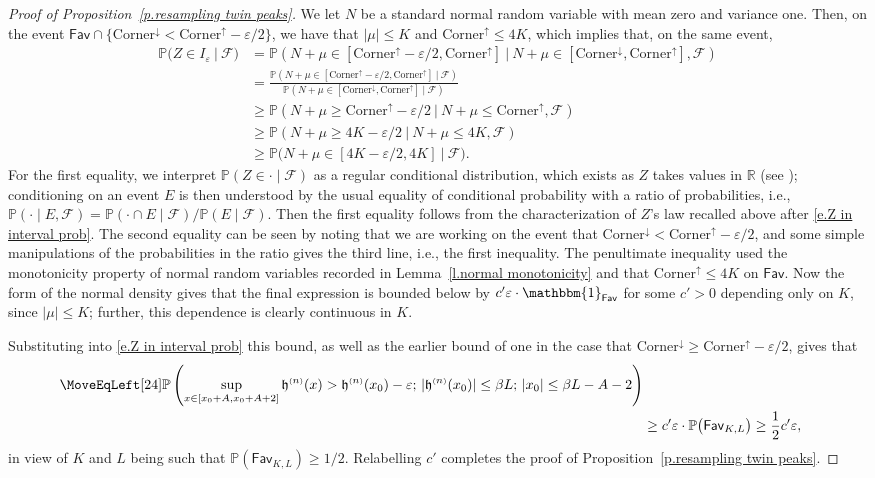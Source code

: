 \documentclass[oneside,final,11pt]{amsart}
\theoremstyle{definition}
\newcommand{\Corner}{\mathrm{Corner}}
\newcommand{\fav}{\mathsf{Fav}}
\newcommand{\fh}{\mathfrak{h}}
\newcommand{\h}{\fh^{{\scriptscriptstyle(}n{\scriptscriptstyle)}}}
\newcommand{\R}{\mathbb{R}}
\newcommand{\1}[1]{\mathbf{1}_{#1}}
\newcommand{\F}{\mathscr{F}}
\newcommand{\one}{\mathbbm{1}}
\newcommand{\smallconst}{c'}
\renewcommand{\P}{\mathbb P}
\numberwithin{equation}{section}
\begin{document}
\begin{proof}[Proof of Proposition~\ref{p.resampling twin peaks}]
We let $N$ be a standard normal random variable with mean zero and variance one. Then, on the event $\fav\cap\{\Corner^{\downarrow} < \Corner^{\uparrow}-\varepsilon/2\}$, we have that $|\mu| \leq K$ and $\Corner^{\uparrow} \leq 4K$, which implies that, on the same event,
%
\begin{align*}
\P\big(Z \in I_\varepsilon\ \big|\ \F\big)
%
&= \P\left(N +\mu \in [\Corner^{\uparrow} -\varepsilon/2, \Corner^{\uparrow}]\  \Big|\  N+\mu \in [\Corner^{\downarrow}, \Corner^{\uparrow}], \F\right)\\
%
&= \frac{\P\left(N +\mu \in [\Corner^{\uparrow} -\varepsilon/2, \Corner^{\uparrow}]\  \Big|\ \F\right)}{\P\left(N+\mu \in [\Corner^{\downarrow}, \Corner^{\uparrow}]\  \Big|\   \F\right)}\\
%
&\geq \P\left(N+\mu \geq \Corner^{\uparrow} -\varepsilon/2 \  \Big|\  N+\mu \leq \Corner^{\uparrow}, \F\right)\\
%
&\geq \P\left(N +\mu  \geq 4K -\varepsilon/2\  \Big|\ N+\mu \leq 4K, \F\right)\\
%
&\geq  \P\big(N +\mu  \in [4K -\varepsilon/2, 4K]\ \big|\ \F\big).
\end{align*}
%
For the first equality, we interpret $\P(Z\in \cdot \mid \F)$ as a regular conditional distribution, which exists as $Z$ takes values in $\R$ (see \cite[Theorem~6.3]{Kallenberg}); conditioning on an event $E$  is then understood by the usual equality of conditional probability with a ratio of probabilities, i.e., $\P(\cdot \mid E, \F) = \P(\cdot\cap E\mid \F)/\P(E\mid \F)$. Then the first equality follows from the characterization of $Z$'s law recalled above after \eqref{e.Z in interval prob}. The second equality can be seen by noting that we are working on the event that $\Corner^\downarrow < \Corner^\uparrow-\varepsilon/2$, and some simple manipulations of the probabilities in the ratio gives the third line, i.e., the first inequality.
The penultimate inequality used the monotonicity property of normal random variables recorded in Lemma~\ref{l.normal monotonicity} and that $\Corner^{\uparrow}\leq 4K$ on $\fav$. Now the form of the normal density gives that the final expression is bounded below by $\smallconst\varepsilon\cdot\one_\fav$ for some $\smallconst>0$ depending only on $K$, since $|\mu|\leq K$; further, this dependence is clearly continuous in $K$.

Substituting  into \eqref{e.Z in interval prob} this bound, as well as the earlier bound of one in the case that $\Corner^{\downarrow}\geq \Corner^{\uparrow}-\varepsilon/2$, gives that
%
\begin{align*}
\MoveEqLeft[24]
\P\left(\sup_{x\in [x_0+A,x_0+A+2]} \h(x) > \h(x_0) - \varepsilon;\, |\h(x_0)| \leq \beta L; \, |x_0|\leq \beta L-A-2\right)\\
%
&\geq \smallconst\varepsilon\cdot \P\big(\fav_{K,L}\big) \geq \frac{1}{2}\smallconst \varepsilon,
\end{align*}
%
in view of $K$ and $L$ being such that $\P(\fav_{K,L}) \geq 1/2$. Relabelling $\smallconst$ completes the proof of Proposition~\ref{p.resampling twin peaks}.
\end{proof}
\end{document}
